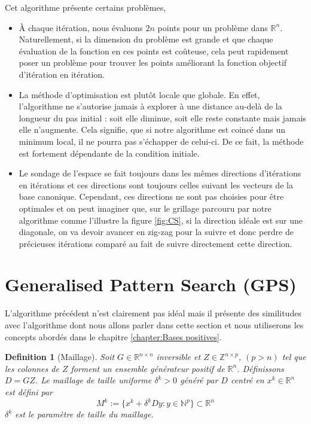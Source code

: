 \documentclass[french]{report}
\newtheorem{defn}{Definition}[section]
\newcommand{\definition}[2]{\begin{defn}[#1] #2 \end{defn}}
\begin{document}
Cet algorithme présente certains problèmes,
\begin{itemize}
    \item À chaque itération, nous évaluons $2n$ points pour un problème dans $\mathbb{R}^n$. Naturellement, si la dimension du problème est grande et que chaque évaluation de la fonction en ces points est coûteuse, cela peut rapidement poser un problème pour trouver les points améliorant la fonction objectif d'itération en itération.
    \item La méthode d'optimisation est plutôt locale que globale. En effet, l'algorithme ne s'autorise jamais à explorer à une distance au-delà de la longueur du pas initial : soit elle diminue, soit elle reste constante mais jamais elle n'augmente. Cela signifie, que si notre algorithme est coincé dans un minimum local, il ne pourra pas s'échapper de celui-ci. De ce fait, la méthode est fortement dépendante de la condition initiale.
    \item Le sondage de l'espace se fait toujours dans les mêmes directions d'itérations en itérations et ces directions sont toujours celles suivant les vecteurs de la base canonique. Cependant, ces directions ne sont pas choisies pour être optimales et on peut imaginer que, sur le grillage parcouru par notre algorithme comme l'illustre la figure \ref{fig:CS}, si la direction idéale est sur une diagonale, on va devoir avancer en zig-zag pour la suivre et donc perdre de précieuses itérations comparé au fait de suivre directement cette direction.
\end{itemize}





\section{Generalised Pattern Search (GPS)}

L'algorithme précédent n'est clairement pas idéal mais il présente des similitudes avec l'algorithme dont nous allons parler dans cette section et nous utiliserons les concepts abordés dans le chapitre \ref{chapter:Bases positives}.

\definition{Maillage}
{
    Soit $G \in \mathbb{R}^{n \times n}$ inversible et $Z \in \mathbb{Z}^{n \times p}$, $(p > n)$ tel que les colonnes de $Z$ forment un ensemble générateur positif de $\mathbb{R}^n$. Définissons $D=GZ$. Le maillage de taille uniforme $\delta^k > 0$ généré par $D$ centré en $x^k \in \mathbb{R}^n$ est défini par
    $$
        M^k := \{ x^k + \delta^k D y : y \in \mathbb{N}^p \} \subset \mathbb{R}^n
    $$
    $\delta^k$ est le paramètre de taille du maillage.
}
\end{document}
